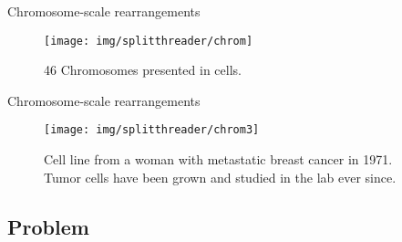 \documentclass[10pt]{beamer}
\newcommand{\1}{
	\setbeamertemplate{background}{
		\texttt{[image: img/1]}
		\tikz[overlay] \fill[fill opacity=0.75,fill=white] (0,0) rectangle (-\paperwidth,\paperheight);
	}
}
\begin{document}
\begin{frame}{Chromosome-scale rearrangements}{}
	\begin{figure}
		\centering
		\texttt{[image: img/splitthreader/chrom]}
		\caption{46 Chromosomes presented in cells.}
	\end{figure}		
\end{frame}

\begin{frame}{Chromosome-scale rearrangements}{}
	\begin{figure}
		\centering
		\texttt{[image: img/splitthreader/chrom3]}
		\caption{Cell line from a woman with metastatic breast cancer in 1971. Tumor cells have been grown and studied in the lab ever since.}
	\end{figure}		
\end{frame}

\subsection{Problem}
\end{document}
